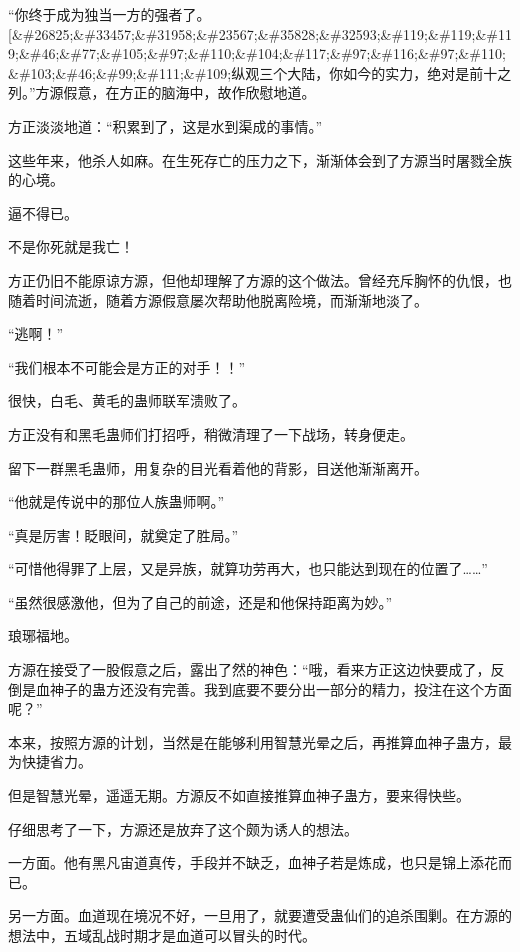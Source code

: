 
\begin{this_body}

“你终于成为独当一方的强者了。[\&\#26825;\&\#33457;\&\#31958;\&\#23567;\&\#35828;\&\#32593;\&\#119;\&\#119;\&\#119;\&\#46;\&\#77;\&\#105;\&\#97;\&\#110;\&\#104;\&\#117;\&\#97;\&\#116;\&\#97;\&\#110;\&\#103;\&\#46;\&\#99;\&\#111;\&\#109;纵观三个大陆，你如今的实力，绝对是前十之列。”方源假意，在方正的脑海中，故作欣慰地道。

方正淡淡地道：“积累到了，这是水到渠成的事情。”

这些年来，他杀人如麻。在生死存亡的压力之下，渐渐体会到了方源当时屠戮全族的心境。

逼不得已。

不是你死就是我亡！

方正仍旧不能原谅方源，但他却理解了方源的这个做法。曾经充斥胸怀的仇恨，也随着时间流逝，随着方源假意屡次帮助他脱离险境，而渐渐地淡了。

“逃啊！”

“我们根本不可能会是方正的对手！！”

很快，白毛、黄毛的蛊师联军溃败了。

方正没有和黑毛蛊师们打招呼，稍微清理了一下战场，转身便走。

留下一群黑毛蛊师，用复杂的目光看着他的背影，目送他渐渐离开。

“他就是传说中的那位人族蛊师啊。”

“真是厉害！眨眼间，就奠定了胜局。”

“可惜他得罪了上层，又是异族，就算功劳再大，也只能达到现在的位置了……”

“虽然很感激他，但为了自己的前途，还是和他保持距离为妙。”

琅琊福地。

方源在接受了一股假意之后，露出了然的神色：“哦，看来方正这边快要成了，反倒是血神子的蛊方还没有完善。我到底要不要分出一部分的精力，投注在这个方面呢？”

本来，按照方源的计划，当然是在能够利用智慧光晕之后，再推算血神子蛊方，最为快捷省力。

但是智慧光晕，遥遥无期。方源反不如直接推算血神子蛊方，要来得快些。

仔细思考了一下，方源还是放弃了这个颇为诱人的想法。

一方面。他有黑凡宙道真传，手段并不缺乏，血神子若是炼成，也只是锦上添花而已。

另一方面。血道现在境况不好，一旦用了，就要遭受蛊仙们的追杀围剿。在方源的想法中，五域乱战时期才是血道可以冒头的时代。


\end{this_body}
